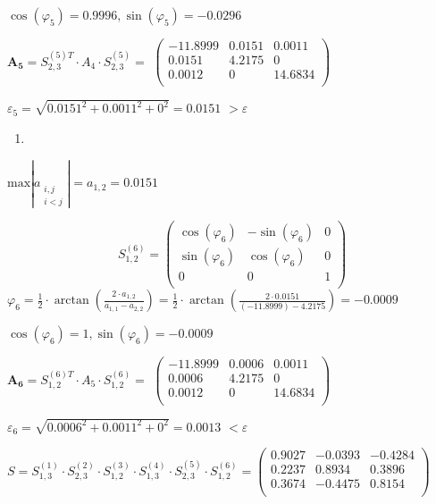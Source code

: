 \documentclass[10pt, a4paper]{scrartcl}
\begin{document}
\(\displaystyle \cos(\varphi_5) = 0.9996, \sin(\varphi_5) = -0.0296\)

\(\displaystyle \mathbf{A_5} = S_{2,3}^{(5)T} \cdot A_4 \cdot S_{2,3}^{(5)} =\)
\(\displaystyle \begin{pmatrix} -11.8999 & 0.0151 & 0.0011\\ 0.0151 & 4.2175 & 0\\ 0.0012 & 0 & 14.6834\\ \end{pmatrix}\)

\(\displaystyle \varepsilon_5 = \sqrt{0.0151^2 + 0.0011^2 + 0^2 } = \mathbf{0.0151}\)
\(\displaystyle > \varepsilon\)

\pagebreak

\begin{enumerate}
\def\labelenumi{\arabic{enumi})}
\setcounter{enumi}{5}
\item
\end{enumerate}

\(\displaystyle \text{max} |a_{\substack{i,j \\ i<j}}| = a_{1,2} = 0.0151\)

\[S_{1,2}^{(6)} = \begin{pmatrix} 
\cos(\varphi_{6}) & -\sin(\varphi_{6}) & 0\\
\sin(\varphi_{6}) & \cos(\varphi_{6}) & 0\\
0 & 0 & 1\\
\end{pmatrix}\]
\(\displaystyle \varphi_{6} = \frac{1}{2} \cdot \arctan\left(\frac{2 \cdot a_{1,2}}{a_{1,1} - a_{2,2}}\right) = \frac{1}{2} \cdot \arctan\left(\frac{2 \cdot 0.0151}{(-11.8999) - 4.2175}\right) = -0.0009\)

\(\displaystyle \cos(\varphi_6) = 1, \sin(\varphi_6) = -0.0009\)

\(\displaystyle \mathbf{A_6} = S_{1,2}^{(6)T} \cdot A_5 \cdot S_{1,2}^{(6)} =\)
\(\displaystyle \begin{pmatrix} -11.8999 & 0.0006 & 0.0011\\ 0.0006 & 4.2175 & 0\\ 0.0012 & 0 & 14.6834\\ \end{pmatrix}\)

\(\displaystyle \varepsilon_6 = \sqrt{0.0006^2 + 0.0011^2 + 0^2 } = \mathbf{0.0013}\)
\(\displaystyle < \varepsilon\)

\(\displaystyle S = S_{1,3}^{(1)} \cdot S_{2,3}^{(2)} \cdot S_{1,2}^{(3)} \cdot S_{1,3}^{(4)} \cdot S_{2,3}^{(5)} \cdot S_{1,2}^{(6)} = \begin{pmatrix} 0.9027 & -0.0393 & -0.4284\\ 0.2237 & 0.8934 & 0.3896\\ 0.3674 & -0.4475 & 0.8154\\ \end{pmatrix}\)
\end{document}
